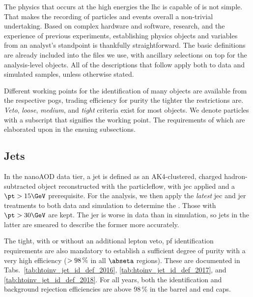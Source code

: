 The physics that occurs at the high energies the \acrshort{lhc} is capable of is not simple. That makes the recording of particles and events overall a non-trivial undertaking. Based on complex hardware and software, research, and the experience of previous experiments, establishing physics objects and variables from an analyst's standpoint is thankfully straightforward. The basic definitions are already included into the \ROOT files we use, with ancillary selections on top for the analysis-level objects. All of the descriptions that follow apply both to data and simulated samples, unless otherwise stated.

Different working points for the identification of many objects are available from the respective \glspl{pog}, trading efficiency for purity the tighter the restrictions are. \emph{Veto}, \emph{loose}, \emph{medium}, and \emph{tight} criteria exist for most objects. We denote particles with a subscript that signifies the working point. The requirements of which are elaborated upon in the ensuing subsections.




\subsection{Jets}
\label{subsec:objects_jets}

In the nanoAOD data tier, a \gls{jet} is defined as an AK4-clustered, charged hadron-subtracted object reconstructed with the \gls{particleflow}, with \acrlong{jec} applied and a $\pt > \text{15}\GeV$ prerequisite. For the analysis, we then apply the \emph{latest} \acrshort{jec} and \acrfull{jer} treatments to both data and simulation to determine the \pt. Those with $\pt > \text{30}\GeV$ are kept. The \acrshort{jer} is worse in data than in simulation, so \glspl{jet} in the latter are smeared to describe the former more accurately.


The tight, with or without an additional lepton veto, \acrshort{pf} identification requirements are also mandatory to establish a sufficient degree of purity with a very high efficiency ($> \text{98\,\%}$ in all $\abseta$ regions). These are documented in Tabs.~\ref{tab:htoinv_jet_id_def_2016}, \ref{tab:htoinv_jet_id_def_2017}, and \ref{tab:htoinv_jet_id_def_2018}. For all years, both the identification and background rejection efficiencies are above 98\,\% in the barrel and end caps.

